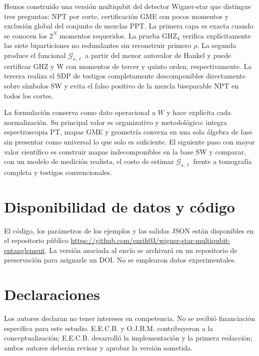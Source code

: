 \documentclass[11pt,a4paper]{article}
\theoremstyle{definition}
\begin{document}
Hemos construido una versión multiqubit del detector Wigner-star que distingue
tres preguntas: NPT por corte, certificación GME con pocos momentos y exclusión
global del conjunto de mezclas PPT. La primera capa es exacta cuando se conocen
los $2^N$ momentos requeridos. La prueba GHZ$_4$ verifica explícitamente las
siete biparticiones no redundantes sin reconstruir primero $\rho$. La segunda
produce el funcional
$\mathcal G_{\star,\ell}$ a partir del menor autovalor de Hankel y puede certificar GHZ y
W con momentos de tercer y quinto orden, respectivamente. La tercera realiza el
SDP de testigos completamente descomponibles directamente sobre símbolos SW y
evita el falso positivo de la mezcla biseparable NPT en todos los cortes.

La formulación conserva como dato operacional a $W$ y hace explícita cada
normalización. Su principal valor es organizativo y metodológico: integra
espectroscopia PT, mapas GME y geometría convexa en una sola álgebra de fase sin
presentar como universal lo que solo es suficiente. El siguiente paso con mayor
valor científico es construir mapas indecomponibles en la base SW y comparar, con
un modelo de medición realista, el costo de estimar $\mathcal G_{\star,\ell}$ frente a
tomografía completa y testigos convencionales.

\section*{Disponibilidad de datos y código}

El código, los parámetros de los ejemplos y las salidas JSON están disponibles
en el repositorio público
\url{https://github.com/enrik03/wigner-star-multiqubit-entanglement}. La versión
asociada al envío se archivará en un repositorio de preservación para asignarle
un DOI. No se emplearon datos experimentales.

\section*{Declaraciones}

Los autores declaran no tener intereses en competencia. No se recibió
financiación específica para este estudio. E.E.C.B. y O.J.B.M. contribuyeron a
la conceptualización; E.E.C.B. desarrolló la implementación y la primera
redacción; ambos autores deberán revisar y aprobar la versión sometida.

{\small


}
\end{document}
